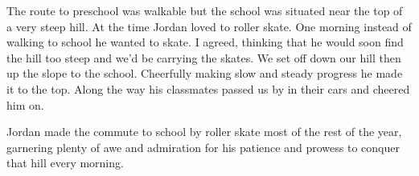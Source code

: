 The route to preschool was walkable but the school was situated near the top of
a very steep hill. At the time Jordan loved to roller skate. One morning
instead of walking to school he wanted to skate. I agreed, thinking that he
would soon find the hill too steep and we'd be carrying the skates.  We set off
down our hill then up the slope to the school. Cheerfully making slow and
steady progress he made it to the top. Along the way his classmates passed us
by in their cars and cheered him on.

Jordan made the commute to school by roller skate most of the rest of the year,
garnering plenty of awe and admiration for his patience and prowess to conquer
that hill every morning.
